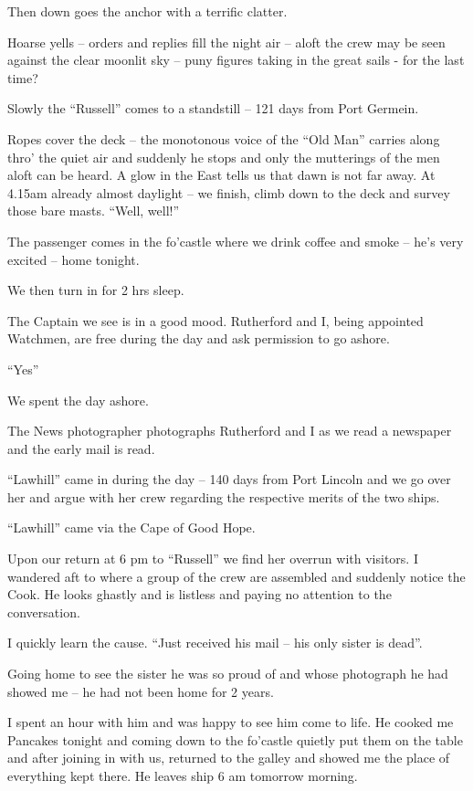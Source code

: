\documentclass[
  11pt,
  msmallroyalvopaper
]{memoir}
\begin{document}
Then down goes the anchor with a terrific clatter.

Hoarse yells -- orders and replies fill the night air -- aloft the crew
may be seen against the clear moonlit sky -- puny figures taking in the
great sails - for the last time?

Slowly the ``Russell'' comes to a standstill -- 121 days from Port
Germein.

Ropes cover the deck -- the monotonous voice of the ``Old Man'' carries
along thro' the quiet air and suddenly he stops and only the mutterings
of the men aloft can be heard. A glow in the East tells us that dawn is
not far away. At 4.15am already almost daylight -- we finish, climb down
to the deck and survey those bare masts. ``Well, well!''

The passenger comes in the fo'castle where we drink coffee and smoke --
he's very excited -- home tonight.

We then turn in for 2 hrs sleep.

The Captain we see is in a good mood. Rutherford and I, being appointed
Watchmen, are free during the day and ask permission to go ashore.

``Yes''

We spent the day ashore.

The News photographer photographs Rutherford and I as we read a
newspaper and the early mail is read.

``Lawhill'' came in during the day -- 140 days from Port Lincoln and we
go over her and argue with her crew regarding the respective merits of
the two ships.

``Lawhill'' came via the Cape of Good Hope.

Upon our return at 6 pm to ``Russell'' we find her overrun with
visitors. I wandered aft to where a group of the crew are assembled and
suddenly notice the Cook. He looks ghastly and is listless and paying no
attention to the conversation.

I quickly learn the cause. ``Just received his mail -- his only sister
is dead''.

Going home to see the sister he was so proud of and whose photograph he
had showed me -- he had not been home for 2 years.

I spent an hour with him and was happy to see him come to life. He
cooked me Pancakes tonight and coming down to the fo'castle quietly put
them on the table and after joining in with us, returned to the galley
and showed me the place of everything kept there. He leaves ship 6 am
tomorrow morning.
\end{document}
